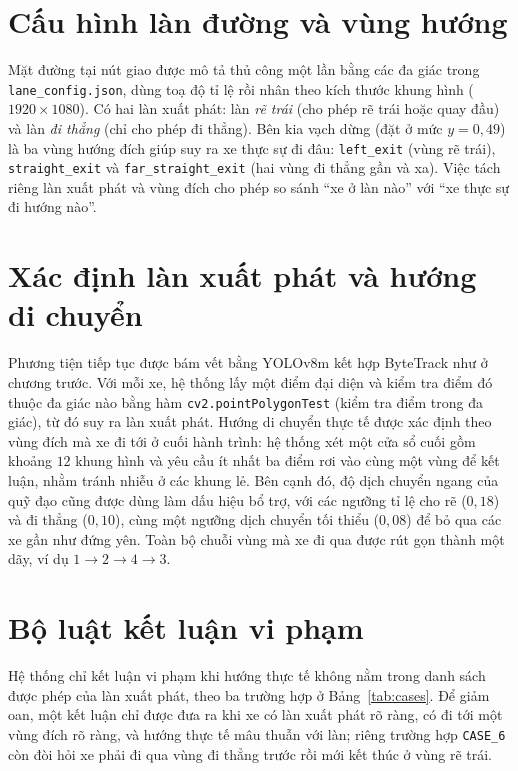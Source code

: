 \documentclass[12pt,a4paper]{report}
\begin{document}
\section{Cấu hình làn đường và vùng hướng}
Mặt đường tại nút giao được mô tả thủ công một lần bằng các đa giác trong \texttt{lane\_config.json}, dùng toạ độ tỉ lệ rồi nhân theo kích thước khung hình ($1920\times1080$). Có hai làn xuất phát: làn \emph{rẽ trái} (cho phép rẽ trái hoặc quay đầu) và làn \emph{đi thẳng} (chỉ cho phép đi thẳng). Bên kia vạch dừng (đặt ở mức $y=0{,}49$) là ba vùng hướng đích giúp suy ra xe thực sự đi đâu: \texttt{left\_exit} (vùng rẽ trái), \texttt{straight\_exit} và \texttt{far\_straight\_exit} (hai vùng đi thẳng gần và xa). Việc tách riêng làn xuất phát và vùng đích cho phép so sánh ``xe ở làn nào'' với ``xe thực sự đi hướng nào''.

\section{Xác định làn xuất phát và hướng di chuyển}
Phương tiện tiếp tục được bám vết bằng YOLOv8m kết hợp ByteTrack như ở chương trước. Với mỗi xe, hệ thống lấy một điểm đại diện và kiểm tra điểm đó thuộc đa giác nào bằng hàm \texttt{cv2.pointPolygonTest} (kiểm tra điểm trong đa giác), từ đó suy ra làn xuất phát. Hướng di chuyển thực tế được xác định theo vùng đích mà xe đi tới ở cuối hành trình: hệ thống xét một cửa sổ cuối gồm khoảng $12$ khung hình và yêu cầu ít nhất ba điểm rơi vào cùng một vùng để kết luận, nhằm tránh nhiễu ở các khung lẻ. Bên cạnh đó, độ dịch chuyển ngang của quỹ đạo cũng được dùng làm dấu hiệu bổ trợ, với các ngưỡng tỉ lệ cho rẽ ($0{,}18$) và đi thẳng ($0{,}10$), cùng một ngưỡng dịch chuyển tối thiểu ($0{,}08$) để bỏ qua các xe gần như đứng yên. Toàn bộ chuỗi vùng mà xe đi qua được rút gọn thành một dãy, ví dụ $1\!\to\!2\!\to\!4\!\to\!3$.

\section{Bộ luật kết luận vi phạm}
Hệ thống chỉ kết luận vi phạm khi hướng thực tế không nằm trong danh sách được phép của làn xuất phát, theo ba trường hợp ở Bảng~\ref{tab:cases}. Để giảm oan, một kết luận chỉ được đưa ra khi xe có làn xuất phát rõ ràng, có đi tới một vùng đích rõ ràng, và hướng thực tế mâu thuẫn với làn; riêng trường hợp \texttt{CASE\_6} còn đòi hỏi xe phải đi qua vùng đi thẳng trước rồi mới kết thúc ở vùng rẽ trái.
\end{document}
